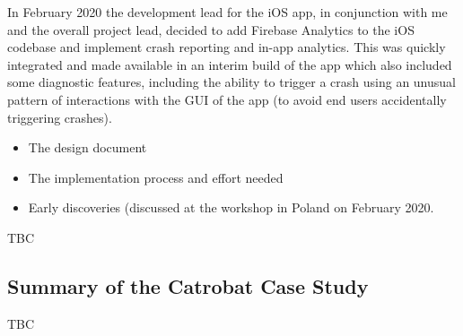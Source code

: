 In February 2020 the development lead for the iOS app, in conjunction with me and the overall project lead, decided to add Firebase Analytics to the iOS codebase and implement crash reporting and in-app analytics. This was quickly integrated and made available in an interim build of the app which also included some diagnostic features, including the ability to trigger a crash using an unusual pattern of interactions with the GUI of the app (to avoid end users accidentally triggering crashes).


\begin{itemize}
    \item The design document
    \item The implementation process and effort needed
    \item Early discoveries (discussed at the workshop in Poland on  February 2020.
\end{itemize}
TBC

\subsection{Summary of the Catrobat Case Study}
TBC
